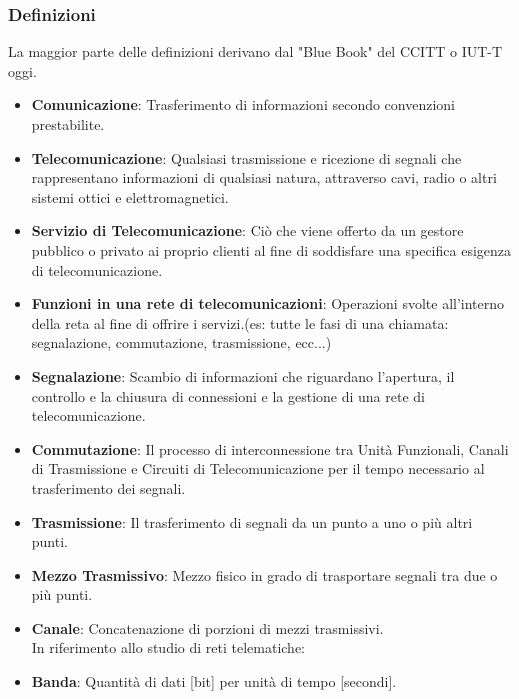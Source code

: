 \documentclass[12pt]{article}
\begin{document}
\subsubsection{Definizioni}
La maggior parte delle definizioni derivano dal "Blue Book" del CCITT o IUT-T oggi.\\
\begin{itemize}
  \item \textbf{Comunicazione}: Trasferimento di informazioni secondo convenzioni prestabilite.\\
  \item \textbf{Telecomunicazione}: Qualsiasi trasmissione e ricezione di segnali che rappresentano informazioni di qualsiasi natura, attraverso cavi, radio o altri sistemi ottici e elettromagnetici.\\
  \item \textbf{Servizio di Telecomunicazione}: Ciò che viene offerto da un gestore pubblico o privato ai proprio clienti al fine di soddisfare una specifica esigenza di telecomunicazione.\\
  \item \textbf{Funzioni in una rete di telecomunicazioni}: Operazioni svolte all'interno della reta al fine di offrire i servizi.(es: tutte le fasi di una chiamata: segnalazione, commutazione, trasmissione, ecc...)\\
  \item \textbf{Segnalazione}: Scambio di informazioni che riguardano l'apertura, il controllo e la chiusura di connessioni e la gestione di una rete di telecomunicazione.\\
  \item \textbf{Commutazione}: Il processo di interconnessione tra Unità Funzionali, Canali di Trasmissione e Circuiti di Telecomunicazione per il tempo necessario al trasferimento dei segnali.\\
  \item \textbf{Trasmissione}: Il trasferimento di segnali da un punto a uno o più altri punti.\\
  \item \textbf{Mezzo Trasmissivo}: Mezzo fisico in grado di trasportare segnali tra due o più punti.\\
  \item \textbf{Canale}: Concatenazione di porzioni di mezzi trasmissivi.\\
  In riferimento allo studio di reti telematiche:\\
  \item \textbf{Banda}: Quantità di dati [bit] per unità di tempo [secondi].\\

\end{itemize}
\end{document}
